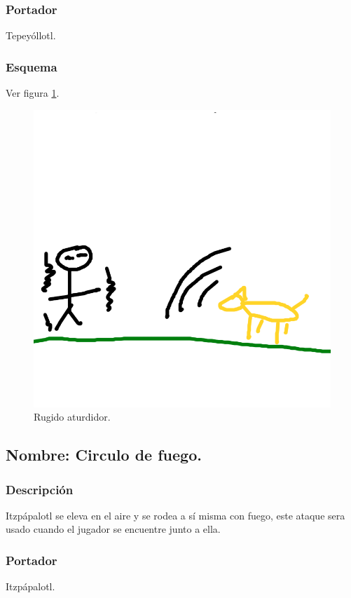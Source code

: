 \documentclass[11pt,letterpaper]{article}
\begin{document}
\subsubsection{Portador}
Tepeyóllotl. 
\subsubsection{Esquema}
			Ver figura \ref{fig:rugido}.
			\begin{figure}
				\centering
				\includegraphics[height=0.2 \textheight]{Imagenes/rugido}
				\caption{Rugido aturdidor.}
				\label{fig:rugido}
			\end{figure}
\subsection{Nombre: Circulo de fuego.}
\subsubsection{Descripción}
Itzpápalotl se eleva en el aire y se rodea a sí misma con fuego, este ataque sera usado cuando el jugador se encuentre junto a ella.
\subsubsection{Portador}
Itzpápalotl. 
\end{document}
